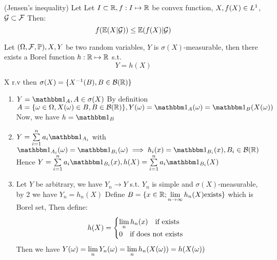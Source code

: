 \begin{thm}(Jensen's inequality)
\label{CJensen} Let 
Let $I\subset\mathbb{R}, f: I\mapsto \mathbb{R}$ be convex function, $X, f(X) \in L^{1}$, $\mathcal{G} \subset \mathcal{F}$ Then:
\begin{equation*}
    f(\mathbb{E}(X|\mathcal{G})) \leq \mathbb{E}(f(X)|\mathcal{G})
\end{equation*}
\end{thm}

\begin{thm}
Let $(\Omega,\mathcal{F}, \mathbb{P}), X,Y$ be two random variables, $Y$ is $\sigma(X)$-measurable, then there exists a Borel function $h:\mathbb{R}\mapsto\mathbb{R}$ s.t.
\begin{equation*}
    Y = h(X)
\end{equation*}
\end{thm}
\pf X r.v then $\sigma(X)=\{X^{-1}(B), B\in\mathcal{B}(\mathbb{R})\}$
\begin{enumerate}
    \item $Y = \I_A, A\in\sigma(X)$ By definition $A = \{\omega\in\Omega, X(\omega)\in B, B\in\B(\R)\}, Y(\omega) = \I_A(\omega) = \I_B(X(\omega))$ Now, we have $h = \I_B$
    \item $Y = \bigs{i=1}^n a_i \I_{A_i}$ with $\I_{A_i}(\omega) = \I_{B_i}(\omega) \implies h_i(x) = \I_{B_i}(x), B_i\in\B(\R)$ \\
    Hence $Y = \bigs{i=1}^n a_i \I_{B_i}(x), h(X) = \bigs{i=1}^n a_i \I_{B_i}(X)$
    \item Let $Y$ be arbitrary, we have $Y_n \rightarrow Y$ s.t. $Y_n$ is simple and $\sigma(X)$-measurable, by 2 we have $Y_n = h_n(X)$ Define $B = \{x\in\mathbb{R}; \lim\limits_{n\rightarrow\infty }h_n(X) \text{exists}\}$ which is Borel set, Then define:
    \begin{equation*}
        h(X) = \begin{cases}
        \lim\limits_{n} h_n(x) \quad \text{if exists} \\
        0 \quad \text{if does not exists}
        \end{cases}
    \end{equation*} Then we have $Y(\omega) = \lim\limits_{n} Y_n(\omega) = \lim\limits_{n} h_n(X(\omega)) = h(X(\omega))$
\end{enumerate}

